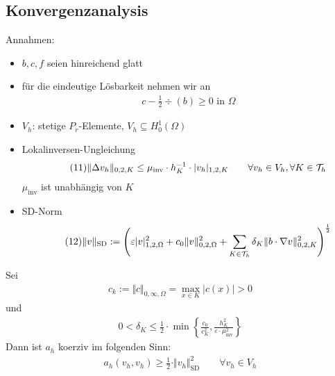 \subsection{Konvergenzanalysis}
Annahmen:
\begin{itemize}
	\item $b,c,f$ seien hinreichend glatt
	\item für die eindeutige Lösbarkeit nehmen wir an
	\begin{align}\label{eq7.3_10}\tag{10}
		c-\frac{1}{2}\div(b)\geq0\text{ in }\Omega
	\end{align}
	\item $V_h$: stetige $P_r$-Elemente, $V_h\subseteq H_0^1(\Omega)$
	\item Lokalinversen-Ungleichung
	\begin{align}\label{eq7.3_11}\tag{11}
		\Vert\Delta v_h\Vert_{0,2,K}\leq\mu_{\text{inv}}\cdot h^{-1}_K\cdot|v_h|_{1,2,K}
		\qquad\forall v_h\in V_h,\forall K\in\mathcal{T}_h
	\end{align}
	$\mu_{\text{inv}}$ ist unabhängig von $K$
	\item SD-Norm
	\begin{align}\label{eq7.3_12}\tag{12}
		\Vert v\Vert_{\text{SD}}:=\left(\varepsilon|v|_{1,2,\Omega}^2+c_0\Vert v\Vert_{0,2,\Omega}^2+\sum\limits_{K\in\mathcal{T}_h}\delta_K\Vert b\cdot\nabla v\Vert^2_{0,2,K}\right)^{\frac{1}{2}}
	\end{align}
\end{itemize}

\begin{lemma}[Koerzivität]\label{lemma7.1Koerzivitaet}
	Sei
	\begin{align*}
		c_k:=\Vert c\Vert_{0,\infty,\Omega}=\max\limits_{x\in K}\big|c(x)\big|>0
	\end{align*}
	und
	\begin{align}\label{eq7.3_13}\tag{13}
		0<\delta_K\leq\frac{1}{2}\cdot\min\left\lbrace\frac{c_0}{c_K^2},\frac{h_K^2}{\varepsilon\cdot\mu_{\text{inv}}^2}\right\rbrace
	\end{align}
	Dann ist $a_h$ koerziv im folgenden Sinn:
	\begin{align}\label{eq7.3_14}\tag{14}
		a_h(v_h,v_h)\geq\frac{1}{2}\cdot\Vert v_h\Vert_{\text{SD}}^2\qquad\forall v_h\in V_h
	\end{align}
\end{lemma}

